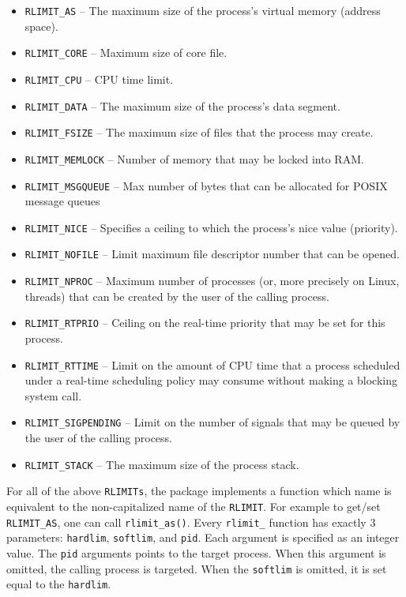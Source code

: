 \documentclass[article]{jss}
\newcommand{\RAppArmor}{\pkg{RAppArmor}\xspace}
\begin{document}
\begin{itemize}
  \item \texttt{RLIMIT\_AS} -- The maximum size of the process's virtual memory
  (address space).
  \item \texttt{RLIMIT\_CORE} -- Maximum size of core file.
  \item \texttt{RLIMIT\_CPU} -- CPU time limit.
  \item \texttt{RLIMIT\_DATA} --  The maximum size of the process's data
  segment.
  \item \texttt{RLIMIT\_FSIZE} --  The maximum size of files that the process
  may create.
  \item \texttt{RLIMIT\_MEMLOCK} -- Number of memory that may be locked into
  RAM.
  \item \texttt{RLIMIT\_MSGQUEUE} -- Max number of bytes that can be allocated
  for POSIX message queues
  \item \texttt{RLIMIT\_NICE} --  Specifies a ceiling to which the process's
  nice value (priority).
  \item \texttt{RLIMIT\_NOFILE} -- Limit maximum file descriptor number that can
  be opened.
  \item \texttt{RLIMIT\_NPROC} -- Maximum number of processes (or, more
  precisely on Linux, threads) that can be created by the user of the calling process.
  \item \texttt{RLIMIT\_RTPRIO} -- Ceiling on the real-time priority that may be
  set for this process.
  \item \texttt{RLIMIT\_RTTIME} -- Limit on the amount of CPU time that a
  process scheduled under a real-time scheduling policy may consume without making a blocking system call.
  \item \texttt{RLIMIT\_SIGPENDING} -- Limit on the number of signals that may
  be queued by the user of the calling process.
  \item \texttt{RLIMIT\_STACK} -- The maximum size of the process stack.
\end{itemize}

For all of the above \texttt{RLIMITs}, the \RAppArmor package implements a
function which name is equivalent to the non-capitalized name of the
\texttt{RLIMIT}. For example to get/set \texttt{RLIMIT\_AS}, one can call
\texttt{rlimit\_as()}. Every \texttt{rlimit\_} function has exactly 3 parameters:
\texttt{hardlim}, \texttt{softlim}, and \texttt{pid}. Each argument is
specified as an integer value. The \texttt{pid} arguments points to the target
process. When this argument is omitted, the calling process is targeted. When
the \texttt{softlim} is omitted, it is set equal to the \texttt{hardlim}.
\end{document}
